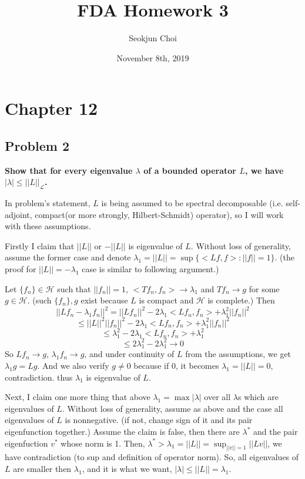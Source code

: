 \documentclass{article}
\begin{document}
\title{FDA Homework 3}
\author{Seokjun Choi}
\date{November 8th, 2019}
\maketitle

\section{Chapter 12}
\subsection{Problem 2}
\textbf{
Show that for every eigenvalue $\lambda$ of a bounded operator $L$,
we have $|\lambda|\leq||L||_{\mathcal{L}}$.
}

In problem's statement, $L$ is being assumed to be spectral decomposable 
(i.e. self-adjoint, compact(or more strongly, Hilbert-Schmidt) operator), so I will work with these assumptions.

Firstly I claim that $||L||$ or $-||L||$ is eigenvalue of $L$.
Without loss of generality, assume the former case and denote $\lambda_1=||L||=\sup\{<Lf,f>:||f||=1\}$.
(the proof for $||L||=-\lambda_1$ case is similar to following argument.)

Let $\{f_n\}\in\mathcal{H}$ such that $||f_n||=1$, $<Tf_n,f_n>\rightarrow\lambda_1$ 
and $Tf_n\rightarrow g$ for some $g\in\mathcal{H}$.
(such $\{f_n\},g$ exist because $L$ is compact and $\mathcal{H}$ is complete.)
Then
\[||Lf_n-\lambda_1 f_n||^2=||Lf_n||^2-2\lambda_1<Lf_n,f_n>+\lambda_1^2||f_n||^2\]
\[\leq ||L||^2||f_n||^2-2\lambda_1<Lf_n,f_n>+\lambda_1^2||f_n||^2\]
\[\leq \lambda_1^2-2\lambda_1<Lf_n,f_n>+\lambda_1^2\]
\[\leq 2\lambda_1^2-2\lambda_1^2\rightarrow 0\]
So $Lf_n\rightarrow g$, $\lambda_1 f_n\rightarrow g$, and under continuity of $L$ from the assumptions,
we get $\lambda_1 g = Lg$. And we also verify $g\neq0$ because if 0, it becomes $\lambda_1=||L||=0$, contradiction.
thus $\lambda_1$ is eigenvalue of $L$.


Next, I claim one more thing that above $\lambda_1=\max{|\lambda|}$ over all $\lambda$s which are eigenvalues of $L$.
Without loss of generality, assume as above and the case all eigenvalues of $L$ is nonnegative. 
(if not, change sign of it and its pair eigenfunction together.)
Assume the claim is false, then there are $\lambda^*$ and the pair eigenfuction $v^*$ whose norm is 1.
Then, $\lambda^*>\lambda_1=||L||=\sup_{||v||=1}||Lv||$, we have contradiction (to sup and definition of operator norm).
So, all eigenvalues of $L$ are smaller then $\lambda_1$, and it is what we want,
$|\lambda|\leq||L||=\lambda_1$.
\end{document}
